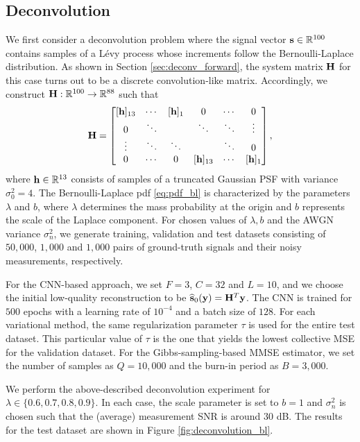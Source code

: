 \documentclass[journal]{IEEEtran}
\begin{document}
\subsection{Deconvolution}
We first consider a deconvolution problem where the signal vector ${\bf{s}} \in \mathbb{R}^{100}$ contains samples of a L\'{e}vy process whose increments follow the Bernoulli-Laplace distribution. As shown in Section \ref{sec:deconv_forward}, the system matrix ${\bf{H}}$ for this case turns out to be a discrete convolution-like matrix. Accordingly, we construct ${\bf{H}}: \mathbb{R}^{100} \rightarrow \mathbb{R}^{88}$ such that
\begin{equation}
    {\bf{H}} = \begin{bmatrix}
        [{\bf{h}}]_{13} & \cdots & [{\bf{h}}]_1 & 0  & \cdots & 0 \\
        0 & \ddots & & \ddots & \ddots & \vdots \\ 
        \vdots & \ddots & \ddots & & \ddots & 0 \\
        0 & \cdots & 0 & [{\bf{h}}]_{13} & \cdots & [{\bf{h}}]_1
        \end{bmatrix},
\end{equation}
where ${\bf{h}} \in \mathbb{R}^{13}$ consists of samples of a truncated Gaussian PSF with variance $\sigma_{0}^{2} = 4$. The Bernoulli-Laplace pdf \eqref{eq:pdf_bl} is characterized by the parameters $\lambda$ and $b$, where $\lambda$ determines the mass probability at the origin and $b$ represents the scale of the Laplace component. For chosen values of $\lambda, b$ and the AWGN variance $\sigma_n^{2}$, we generate training, validation and test datasets consisting of $50,000$, $1,000$ and $1,000$ pairs of ground-truth signals and their noisy measurements, respectively. 

For the CNN-based approach, we set $F=3$, $C=32$ and $L=10$, and we choose the initial low-quality reconstruction to be $\widehat{{\bf{s}}}_{0}({\bf{y}}) = {\bf{H}}^{T} {\bf{y}}$. The CNN is trained for $500$ epochs with a learning rate of $10^{-4}$ and a batch size of $128$. For each variational method, the same regularization parameter $\tau$ is used for the entire test dataset. This particular value of $\tau$ is the one that yields the lowest collective MSE for the validation dataset. For the Gibbs-sampling-based MMSE estimator, we set the number of samples as $Q=10,000$ and the burn-in period as $B=3,000$.

We perform the above-described deconvolution experiment for $\lambda \in \{ 0.6, 0.7, 0.8, 0.9 \}$. In each case, the scale parameter is set to $b=1$ and $\sigma_n^{2}$ is chosen such that the (average) measurement SNR is around $30$ dB. The results for the test dataset are shown in Figure \ref{fig:deconvolution_bl}.
\end{document}
